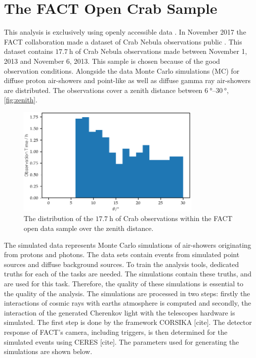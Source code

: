 \chapter{The FACT Open Crab Sample}
%
This analysis is exclusively using openly accessible data \cite{fact-data}. In November 2017 the
FACT collaboration made a dataset of Crab Nebula observations public
\cite{FACT-Design, FACT-Calib}. This dataset contains $\SI{17.7}{\hour}$
of Crab Nebula observations made between November 1, 2013 and November 6, 2013.
This sample is chosen because of the good observation conditions. Alongside the
data Monte Carlo simulations (MC) for diffuse proton air-showers and point-like
as well as diffuse gamma ray air-showers are distributed. The observations
cover a zenith distance between $\SIrange{6}{30}{\degree}$, \autoref{fig:zenith}.
%
\begin{figure}
  \centering%
  \includegraphics[width=0.8\textwidth]{Plots/zenith.pdf}%
  \caption{The distribution of the $\SI{17.7}{\hour}$ of Crab observations within the FACT open data sample over the zenith distance.}%
  \label{fig:zenith}%
\end{figure}
%
The simulated data represents Monte Carlo simulations of air-showers
originating from protons and photons. The data sets contain events from
simulated point sources and diffuse background sources. To train the analysis
tools, dedicated truths for each of the tasks are needed. The simulations
contain these truths, and are used for this task. Therefore, the quality of
these simulations is essential to the quality of the analysis. The simulations
are processed in two steps: firstly the interactions of cosmic rays with earths
atmosphere is computed and secondly, the interaction of the generated Cherenkov
light with the telescopes hardware is simulated. The first step is done by the
framework CORSIKA [cite]. The detector response of FACT's camera, including
triggers, is then determined for the simulated events using CERES [cite]. The
parameters used for generating the simulations are shown below.

